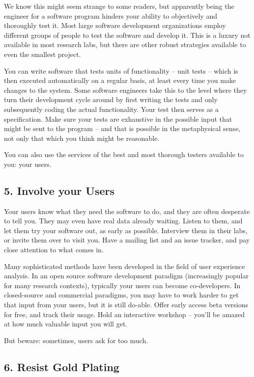 \documentclass{bmcart}
\begin{document}
We know this might seem strange to some readers, but apparently being the engineer for a software program hinders your ability to objectively and thoroughly test it. Most large software development organizations employ different groups of people to test the software and develop it. This is a luxury not available in most research labs, but there are other robust strategies available to even the smallest project. 

You can write software that tests units of functionality -- unit tests -- which is then executed automatically on a regular basis, at least every time you make changes to the system. Some software engineers take this to the level where they turn their development cycle around by first writing the tests and only subsequently coding the actual functionality. Your test then serves as a specification. Make sure your tests are exhaustive in the possible input that might be sent to the program -- and that is possible in the metaphysical sense, not only that which you think might be reasonable. 

You can also use the services of the best and most thorough testers available to you: your users. 

\subsection*{5. Involve your Users}

Your users know what they need the software to do, and they are often desperate to tell you. They may even have real data already waiting. Listen to them, and let them try your software out, as early as possible. Interview them in their labs, or invite them over to visit you. Have a mailing list and an issue tracker, and pay close attention to what comes in.  

Many sophisticated methods have been developed in the field of user experience analysis. In an open source software development paradigm (increasingly popular for many research contexts), typically your users can become co-developers. In closed-source and commercial paradigms, you may have to work harder to get that input from your users, but it is still do-able. Offer early access beta versions for free, and track their usage. Hold an interactive workshop \cite{pavelin2014} -- you'll be amazed at how much valuable input you will get. 

But beware: sometimes, users ask for too much. 

\subsection*{6. Resist Gold Plating}
\end{document}
